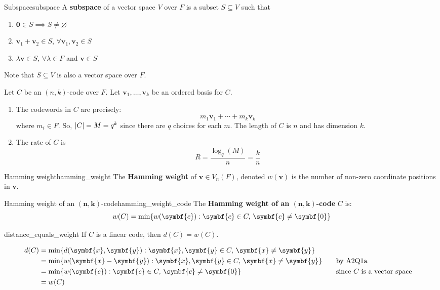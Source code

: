 \begin{Definition}{Subspace}{subspace}
    A \textbf{subspace} of a vector space $ V $ over $ F $ is a subset
    $ S\subseteq V $ such that
    \begin{enumerate}[label=V\arabic*]
        \item $ \symbf{0}\in S \implies S\neq \varnothing $
        \item $ \symbf{v}_1+\symbf{v}_2\in S $, $ \forall \symbf{v}_1,\symbf{v}_2\in S $
        \item $ \lambda \symbf{v}\in S $, $ \forall \lambda\in F $ and $ \symbf{v}\in S $
    \end{enumerate}
    Note that $ S\subseteq V $ is also a vector space over $ F $.
\end{Definition}

Let $ C $ be an $ (n,k) $-code over $ F $. Let $ \symbf{v}_1,\ldots,\symbf{v}_k $ be
an ordered basis for $ C $.
\begin{enumerate}[label=(\arabic*)]
    \item The codewords in $ C $ are precisely:
          \[ m_1\symbf{v}_1+\cdots +m_k\symbf{v}_k \]
          where $ m_i\in F $. So, $ \lvert C\rvert=M=q^k $ since there are $ q $ choices for each $ m $.
          The length of $ C $ is $ n $ and has dimension $ k $.
    \item The rate of $ C $ is
          \[ R=\frac{\log_q(M)}{n} =\frac{k}{n} \]
\end{enumerate}

\begin{Definition}{Hamming weight}{hamming_weight}
    The \textbf{Hamming weight} of $ \symbf{v}\in V_n(F) $, denoted
    $ w(\symbf{v}) $ is the number of non-zero coordinate positions in $ \symbf{v} $.
\end{Definition}

\begin{Definition}{Hamming weight of an $ \symbf{(n,k)} $-code}{hamming_weight_code}
    The \textbf{Hamming weight of an $ \symbf{(n,k)} $-code} $ C $ is:
    \[ w(C)=\min \set{w(\symbf{c}):\symbf{c}\in C,\,\symbf{c}\neq \symbf{0}} \]
\end{Definition}

\begin{Theorem}{}{distance_equals_weight}
    If $ C $ is a linear code, then $ d(C)=w(C) $.
\end{Theorem}

\begin{Proof}{}{}
    \begin{align*}
        d(C) & =\min \set{d(\symbf{x},\symbf{y}):\symbf{x},\symbf{y}\in C,\,\symbf{x}\neq \symbf{y}}                                              \\
             & =\min \set{w(\symbf{x}-\symbf{y}):\symbf{x},\symbf{y}\in C,\,\symbf{x}\neq \symbf{y}} & \quad & \text{by A2Q1a}                    \\
             & =\min \set{w(\symbf{c}):\symbf{c}\in C,\,\symbf{c}\neq \symbf{0}}                     &       & \text{since $C$ is a vector space} \\
             & =w(C)
    \end{align*}
\end{Proof}


